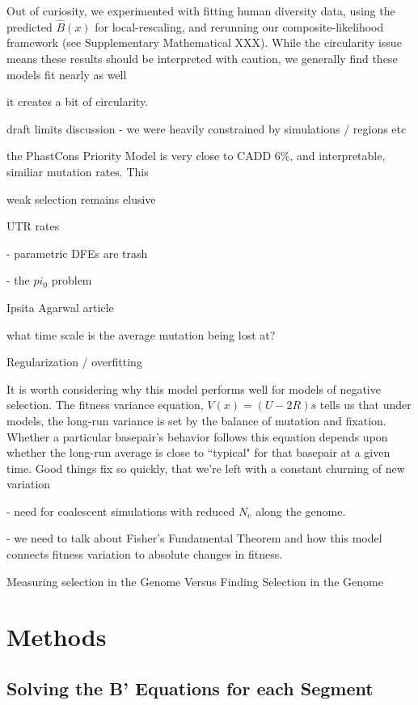 \documentclass[11pt]{article}
\begin{document}
Out of curiosity, we experimented with fitting human diversity data, using the
predicted $\widehat{B}(x)$ for local-rescaling, and rerunning our
composite-likelihood framework (see Supplementary Mathematical XXX). While the
circularity issue means these results should be interpreted with caution, we
generally find these models fit nearly as well 

it creates a bit of circularity. 



draft limits discussion - we were heavily constrained by simulations / regions
etc

the PhastCons Priority Model is very close to CADD 6\%, and interpretable,
similiar mutation rates. This 

weak selection remains elusive

UTR rates 

- parametric DFEs are trash

- the $pi_0$ problem

Ipsita Agarwal article 

what time scale is the average mutation being lost at?

Regularization / overfitting 

It is worth considering why this model performs well for models of negative
selection. The fitness variance equation, $V(x) = (U-2R)s$ tells us that under
models, the long-run variance is set by the balance of mutation and fixation.
Whether a particular basepair's behavior follows this equation depends upon
whether the long-run average is close to ``typical" for that basepair at a
given time. Good things fix so quickly, that we're left with a constant
churning of new variation

- need for coalescent simulations with reduced $N_e$ along the genome.

- we need to talk about Fisher's Fundamental Theorem and how this model
connects fitness variation to absolute changes in fitness.

Measuring selection in the Genome Versus Finding Selection in the Genome


\section*{Methods}

\subsection*{Solving the B' Equations for each Segment}
\label{sec:methods-bprime-eqns}
\end{document}
